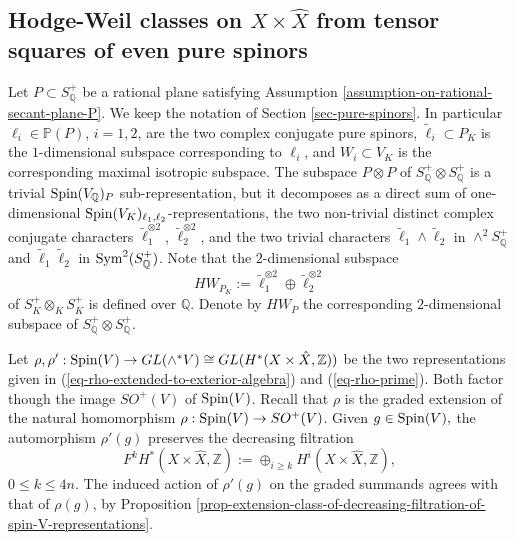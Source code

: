 \documentclass[12pt]{amsart}
\numberwithin{equation}{subsection}
\theoremstyle{plain}
\theoremstyle{definition}
\newcommand{\QQ}{{\mathbb Q}}
\newcommand{\ZZ}{{\mathbb Z}}
\newcommand{\PP}{{\mathbb P}}
\newcommand{\Spin}{{\rm Spin}}
\newcommand{\Sym}{{\rm Sym}}
\begin{document}
\subsection{Hodge-Weil classes on  $X\times\hat{X}$ from tensor squares of even pure spinors}
\label{sec-HW-classes-from-squares-of-pure-spinors}

Let $P\subset S^+_\QQ$ be a rational plane satisfying Assumption \ref{assumption-on-rational-secant-plane-P}. We keep the notation of Section \ref{sec-pure-spinors}. In particular $\ell_i\in\PP(P)$, $i=1,2$, are the two complex conjugate pure spinors, $\tilde{\ell}_i\subset P_K$ is the  $1$-dimensional subspace corresponding to $\ell_i$, and $W_i\subset V_K$ is the corresponding maximal isotropic subspace.
The subspace $P\otimes P$ of $S^+_\QQ\otimes S^+_\QQ$ is a trivial $\Spin(V_\QQ)_P$ sub-representation, but it decomposes as a direct sum of one-dimensional $\Spin(V_K)_{\ell_1,\ell_2}$-representations, the two non-trivial distinct complex conjugate characters $\tilde{\ell}_1^{\otimes 2}$, $\tilde{\ell}_2^{\otimes 2}$, and the two trivial characters $\tilde{\ell}_1\wedge\tilde{\ell}_2$ in $\wedge^2 S^+_\QQ$ and $\tilde{\ell}_1\tilde{\ell}_2$ in $\Sym^2(S^+_\QQ)$. Note that the $2$-dimensional subspace 
\[
HW_{P_K}:=\tilde{\ell}_1^{\otimes 2}\oplus \tilde{\ell}_2^{\otimes 2}
\] 
of $S^+_K\otimes_K S^+_K$ is defined over $\QQ$. 
Denote by $HW_P$ the corresponding $2$-dimensional subspace of $S^+_\QQ\otimes S^+_\QQ$.

Let $\rho,\rho':\Spin(V)\rightarrow GL(\wedge^* V)\cong GL(H^*(X\times\hat{X},\ZZ))$ be the two representations given in (\ref{eq-rho-extended-to-exterior-algebra}) and (\ref{eq-rho-prime}). Both factor though the image $SO^+(V)$ of $\Spin(V)$. 
Recall that $\rho$ is the graded extension of the natural homomorphism $\rho:\Spin(V)\rightarrow SO^+(V)$. 
Given $g\in \Spin(V),$ the automorphism $\rho'(g)$ preserves the decreasing filtration 
\[
F^kH^*(X\times\hat{X},\ZZ):=\oplus_{i\geq k} H^i(X\times\hat{X},\ZZ),
\] 
$0\leq k\leq 4n$. The induced action of $\rho'(g)$ on the graded summands agrees with that of $\rho(g)$, by Proposition \ref{prop-extension-class-of-decreasing-filtration-of-spin-V-representations}.
\end{document}
